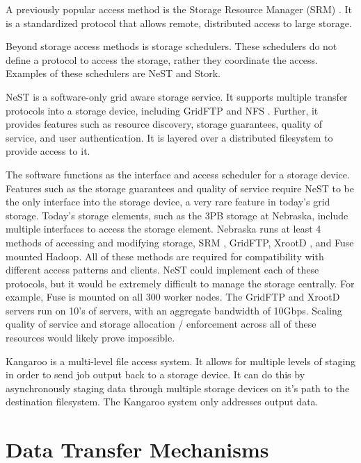 A previously popular access method is the Storage Resource Manager (SRM) \cite{shoshani2002storage}.  It is a standardized protocol that allows remote, distributed access to large storage.  


Beyond storage access methods is storage schedulers.  These schedulers do not define a protocol to access the storage, rather they coordinate the access.  Examples of these schedulers are NeST and Stork.

NeST \cite{bent2002flexibility} is a software-only grid aware storage service.  It supports multiple transfer protocols into a storage device, including GridFTP \cite{allcock2005globus} and NFS \cite{walsh1985overview}.  Further, it provides features such as resource discovery, storage guarantees, quality of service, and user authentication.  It is layered over a distributed filesystem to provide access to it.

The software functions as the interface and access scheduler for a storage device.  Features such as the storage guarantees and quality of service require NeST to be the only interface into the storage device, a very rare feature in today's grid storage.  Today's storage elements, such as the 3PB storage at Nebraska, include multiple interfaces to access the storage element.  Nebraska runs at least 4 \cite{attebury2009hadoop} methods of accessing and modifying storage, SRM \cite{shoshani2002storage}, GridFTP, XrootD \cite{dorigo2005xrootd}, and Fuse \cite{szeredi2010fuse} mounted Hadoop.  All of these methods are required for compatibility with different access patterns and clients.  NeST could implement each of these protocols, but it would be extremely difficult to manage the storage centrally.  For example, Fuse is mounted on all 300 worker nodes.  The GridFTP and XrootD servers run on 10's of servers, with an aggregate bandwidth of 10Gbps.  Scaling quality of service and storage allocation / enforcement across all of these resources would likely prove impossible.




Kangaroo \cite{thain2001kangaroo} is a multi-level file access system.  It allows for multiple levels of staging in order to send job output back to a storage device.  It can do this by asynchronously staging data through multiple storage devices on it's path to the destination filesystem.  The Kangaroo system only addresses output data.

\section{Data Transfer Mechanisms}

